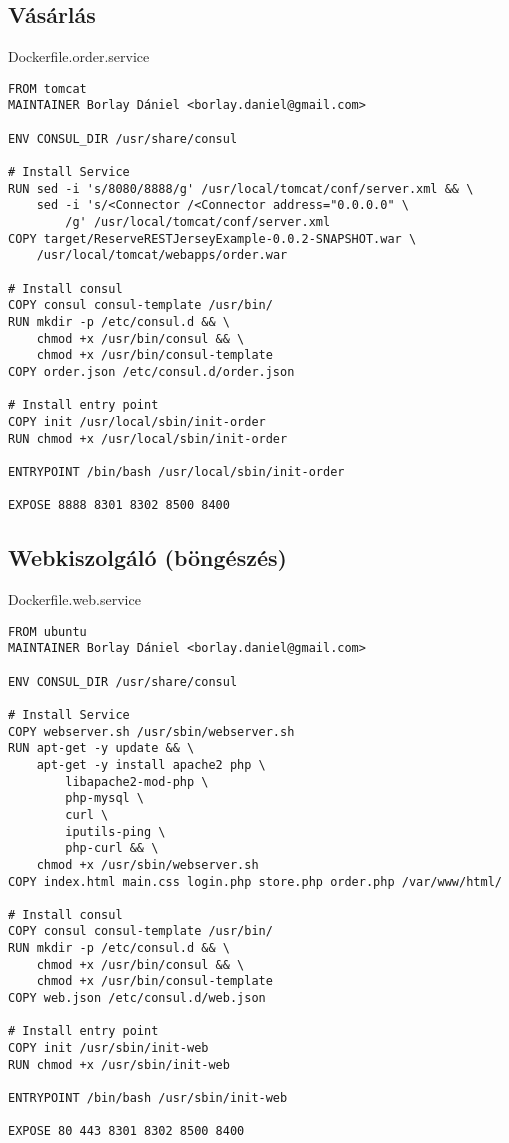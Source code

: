 \subsection{Vásárlás}\label{vuxe1suxe1rluxe1s}

Dockerfile.order.service

\begin{verbatim}
FROM tomcat
MAINTAINER Borlay Dániel <borlay.daniel@gmail.com>

ENV CONSUL_DIR /usr/share/consul

# Install Service
RUN sed -i 's/8080/8888/g' /usr/local/tomcat/conf/server.xml && \
    sed -i 's/<Connector /<Connector address="0.0.0.0" \
        /g' /usr/local/tomcat/conf/server.xml
COPY target/ReserveRESTJerseyExample-0.0.2-SNAPSHOT.war \
    /usr/local/tomcat/webapps/order.war

# Install consul
COPY consul consul-template /usr/bin/
RUN mkdir -p /etc/consul.d && \
    chmod +x /usr/bin/consul && \
    chmod +x /usr/bin/consul-template
COPY order.json /etc/consul.d/order.json

# Install entry point
COPY init /usr/local/sbin/init-order
RUN chmod +x /usr/local/sbin/init-order

ENTRYPOINT /bin/bash /usr/local/sbin/init-order

EXPOSE 8888 8301 8302 8500 8400
\end{verbatim}

\subsection{Webkiszolgáló
(böngészés)}\label{webkiszolguxe1luxf3-buxf6nguxe9szuxe9s}

Dockerfile.web.service

\begin{verbatim}
FROM ubuntu
MAINTAINER Borlay Dániel <borlay.daniel@gmail.com>

ENV CONSUL_DIR /usr/share/consul

# Install Service
COPY webserver.sh /usr/sbin/webserver.sh
RUN apt-get -y update && \
    apt-get -y install apache2 php \
        libapache2-mod-php \
        php-mysql \
        curl \
        iputils-ping \
        php-curl && \
    chmod +x /usr/sbin/webserver.sh
COPY index.html main.css login.php store.php order.php /var/www/html/

# Install consul
COPY consul consul-template /usr/bin/
RUN mkdir -p /etc/consul.d && \
    chmod +x /usr/bin/consul && \
    chmod +x /usr/bin/consul-template
COPY web.json /etc/consul.d/web.json

# Install entry point
COPY init /usr/sbin/init-web
RUN chmod +x /usr/sbin/init-web

ENTRYPOINT /bin/bash /usr/sbin/init-web

EXPOSE 80 443 8301 8302 8500 8400
\end{verbatim}

